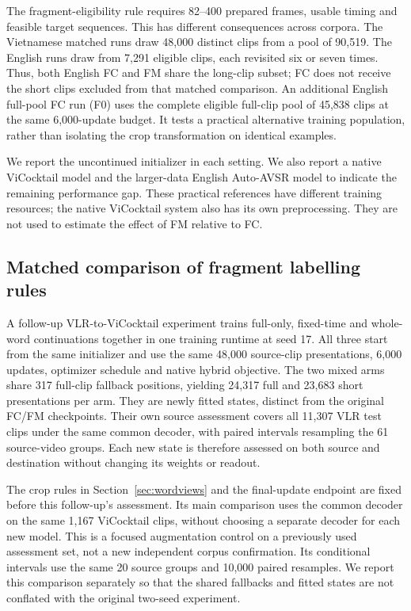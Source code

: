 The fragment-eligibility rule requires 82--400 prepared frames, usable timing
and feasible target sequences. This has different consequences across corpora.
The Vietnamese matched runs draw 48,000 distinct clips from a pool of 90,519. The
English runs draw from 7,291 eligible clips, each revisited six or seven times.
Thus, both English FC and FM share the long-clip subset; FC does not receive the
short clips excluded from that matched comparison. An additional English full-pool
FC run (F0) uses the complete eligible full-clip pool of 45,838 clips at the same
6,000-update budget. It tests a practical alternative training population, rather
than isolating the crop transformation on identical examples.

We report the uncontinued initializer in each setting. We also report a native
ViCocktail model and the larger-data English Auto-AVSR model to indicate the
remaining performance gap. These practical references have different training
resources; the native ViCocktail system also has its own preprocessing. They are
not used to estimate the effect of FM relative to FC.

\subsection{Matched comparison of fragment labelling rules}
\label{sec:matchedcrop}
A follow-up VLR-to-ViCocktail experiment trains full-only, fixed-time and
whole-word continuations together in one training runtime at seed 17.
All three start from the same initializer and use the same 48,000 source-clip
presentations, 6,000 updates, optimizer schedule and native hybrid objective.
The two mixed arms share 317 full-clip fallback positions, yielding 24,317 full
and 23,683 short presentations per arm. They are newly fitted states, distinct
from the original FC/FM checkpoints. Their own source assessment covers all
11,307 VLR test clips under the same common decoder, with paired intervals
resampling the 61 source-video groups. Each new state is therefore assessed
on both source and destination without changing its weights or readout.

The crop rules in Section~\ref{sec:wordviews} and the final-update endpoint are
fixed before this follow-up's assessment. Its main comparison uses the common
decoder on the same 1,167 ViCocktail clips, without choosing a separate decoder
for each new model. This is a focused augmentation control on a previously used
assessment set, not a new independent corpus confirmation. Its conditional
intervals use the same 20 source groups and 10,000 paired resamples. We report
this comparison separately so that the shared fallbacks and fitted states are
not conflated with the original two-seed experiment.

